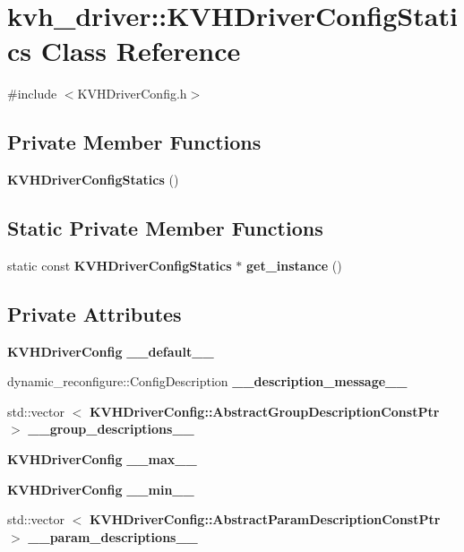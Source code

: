 \section{kvh\-\_\-driver\-:\-:\-K\-V\-H\-Driver\-Config\-Statics \-Class \-Reference}
\label{classkvh__driver_1_1KVHDriverConfigStatics}


{\ttfamily \#include $<$\-K\-V\-H\-Driver\-Config.\-h$>$}

\subsection*{\-Private \-Member \-Functions}
\begin{DoxyCompactItemize}
\item 
{\bf \-K\-V\-H\-Driver\-Config\-Statics} ()
\end{DoxyCompactItemize}
\subsection*{\-Static \-Private \-Member \-Functions}
\begin{DoxyCompactItemize}
\item 
static const \*
{\bf \-K\-V\-H\-Driver\-Config\-Statics} $\ast$ {\bf get\-\_\-instance} ()
\end{DoxyCompactItemize}
\subsection*{\-Private \-Attributes}
\begin{DoxyCompactItemize}
\item 
{\bf \-K\-V\-H\-Driver\-Config} {\bf \-\_\-\-\_\-default\-\_\-\-\_\-}
\item 
dynamic\-\_\-reconfigure\-::\-Config\-Description {\bf \-\_\-\-\_\-description\-\_\-message\-\_\-\-\_\-}
\item 
std\-::vector\*
$<$ {\bf \-K\-V\-H\-Driver\-Config\-::\-Abstract\-Group\-Description\-Const\-Ptr} $>$ {\bf \-\_\-\-\_\-group\-\_\-descriptions\-\_\-\-\_\-}
\item 
{\bf \-K\-V\-H\-Driver\-Config} {\bf \-\_\-\-\_\-max\-\_\-\-\_\-}
\item 
{\bf \-K\-V\-H\-Driver\-Config} {\bf \-\_\-\-\_\-min\-\_\-\-\_\-}
\item 
std\-::vector\*
$<$ {\bf \-K\-V\-H\-Driver\-Config\-::\-Abstract\-Param\-Description\-Const\-Ptr} $>$ {\bf \-\_\-\-\_\-param\-\_\-descriptions\-\_\-\-\_\-}
\end{DoxyCompactItemize}
